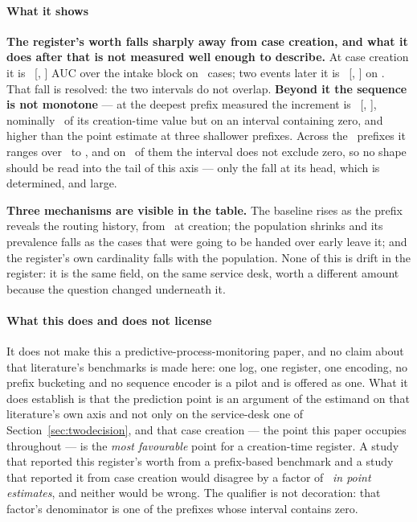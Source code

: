 \paragraph{What it shows}
\textbf{The register's worth falls sharply away from case creation, and
what it does after that is not measured well enough to describe.} At case
creation it is \VPrefixZero\ [\VPrefixZeroLo, \VPrefixZeroHi] AUC over the
intake block on \nPrefixZero\ cases; two events later it is \VPrefixTwo\
[\VPrefixTwoLo, \VPrefixTwoHi] on \nPrefixTwo. That fall is resolved: the two
intervals do not overlap. \textbf{Beyond it the sequence is not monotone} ---
at the deepest prefix measured the increment is \VPrefixEight\
[\VPrefixEightLo, \VPrefixEightHi], nominally \prefixRetainedPct\ of its
creation-time value but on an interval containing zero, and higher than the
point estimate at three shallower prefixes. Across
the \nPrefixLevels\ prefixes it ranges over \prefixVmin\ to \prefixVmax, and
on \nPrefixUnresolved\ of them the interval does not exclude zero, so no
shape should be read into the tail of this axis --- only the fall at its
head, which is determined, and large.

\textbf{Three mechanisms are visible in the table.} The baseline
rises as the prefix reveals the routing history, from \basePrefixZero\ at
creation; the population shrinks and its prevalence falls as the cases that
were going to be handed over early leave it; and the register's own
cardinality falls with the population. None of this is drift in the register:
it is the same field, on the same service desk, worth a different amount because the
question changed underneath it.

\paragraph{What this does and does not license}
It does not make this a predictive-process-monitoring paper, and no claim
about that literature's benchmarks is made here: one log, one register, one
encoding, no prefix bucketing and no sequence encoder is a pilot and is
offered as one. What it does establish is that the prediction point is an
argument of the estimand on that literature's own axis and not only on the
service-desk one of Section~\ref{sec:twodecision}, and that case creation ---
the point this paper occupies throughout --- is the \emph{most favourable}
point for a creation-time register. A study that reported this register's
worth from a prefix-based benchmark and a study that reported it from case
creation would disagree by a factor of \prefixDropFactor\ \emph{in point
estimates}, and neither would be wrong. The qualifier is not decoration: that
factor's denominator is one of the prefixes whose interval contains zero.
